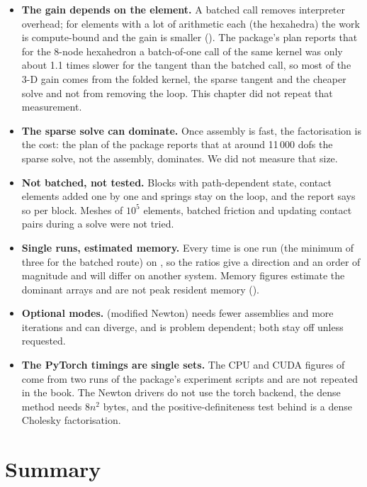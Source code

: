 \begin{limitsbox}
\begin{itemize}
\item \textbf{The gain depends on the element.} A batched call removes interpreter overhead; for elements with a lot of arithmetic each (the hexahedra) the work is compute-bound and the gain is smaller (). The package's plan reports that for the 8-node hexahedron a batch-of-one call of the same kernel was only about 1.1 times slower for the tangent than the batched call, so most of the 3-D gain comes from the folded kernel, the sparse tangent and the cheaper solve and not from removing the loop. This chapter did not repeat that measurement.
\item \textbf{The sparse solve can dominate.} Once assembly is fast, the factorisation is the cost: the plan of the package reports that at around 11\,000 dofs the sparse solve, not the assembly, dominates. We did not measure that size.
\item \textbf{Not batched, not tested.} Blocks with path-dependent state, contact elements added one by one and springs stay on the loop, and the report says so per block. Meshes of $10^5$ elements, batched friction and updating contact pairs during a solve were not tried.
\item \textbf{Single runs, estimated memory.} Every time is one run (the minimum of three for the batched route) on \machine{}, so the ratios give a direction and an order of magnitude and will differ on another system. Memory figures estimate the dominant arrays and are not peak resident memory ().
\item \textbf{Optional modes.}  (modified Newton) needs fewer assemblies and more iterations and can diverge, and  is problem dependent; both stay off unless requested.
\item \textbf{The PyTorch timings are single sets.} The CPU and CUDA figures of  come from two runs of the package's experiment scripts and are not repeated in the book. The Newton drivers do not use the torch backend, the dense method needs $8n^2$ bytes, and the positive-definiteness test behind  is a dense Cholesky factorisation.
\end{itemize}
\end{limitsbox}

\section{Summary}\label{sec:bk-summary}

